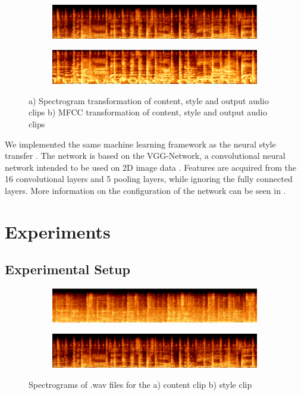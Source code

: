 \documentclass{article}
\begin{document}
\begin{figure}[h]
\begin{subfigure}{\textwidth}
  \centering
  \includegraphics[width = \textwidth]{spec_example}
  \caption{}
\end{subfigure}
 \begin{subfigure}{\textwidth}
  \centering
  \includegraphics[width = \textwidth]{mel_example}
  \caption{}
\end{subfigure}
\caption{a) Spectrogram transformation of content, style and output audio clips b) MFCC transformation of content, style and output audio clips}
\end{figure}

We implemented the same machine learning framework as the neural style transfer \cite{Gatys2015}. The network is based on the VGG-Network, a convolutional neural network intended to be used on 2D image data \citep{Simonyan2014}. Features are acquired from the 16 convolutional layers and 5 pooling layers, while ignoring the fully connected layers. More information on the configuration of the network can be seen in \citep{Gatys2015}.

\section{Experiments}

\subsection{Experimental Setup}

\begin{figure}[h]
\begin{subfigure}{\textwidth}
  \centering
  \includegraphics[width = \textwidth]{content_spec}
  \caption{}
\end{subfigure}
\begin{subfigure}{\textwidth}
  \centering
  \includegraphics[width = \textwidth]{style_spec}
  \caption{}
\end{subfigure}
\caption{Spectrograms of .wav files for the a) content clip b) style clip}
\end{figure}
\end{document}
